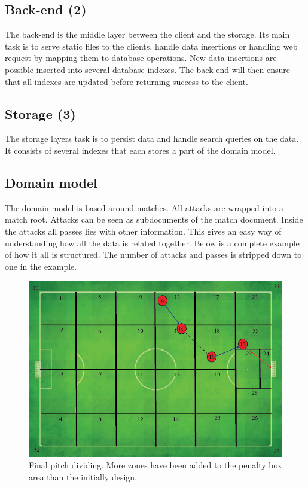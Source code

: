 \subsection{Back-end (2)}

The back-end is the middle layer between the client and the storage. Its main task is to serve static files to the clients, handle data insertions or handling web request by mapping them to database operations. New data insertions are possible inserted into several database indexes. The back-end will then ensure that all indexes are updated before returning success to the client. 

\subsection{Storage (3)}

The storage layers task is to persist data and handle search queries on the data. It consists of several indexes that each stores a part of the domain model. 

\subsection{Domain model}

The domain model is based around matches. All attacks are wrapped into a match root. Attacks can be seen as subdocuments of the match document. Inside the attacks all passes lies with other information. This gives an easy way of understanding how all the data is related together. Below is a complete example of how it all is structured. The number of attacks and passes is stripped down to one in the example.


\label{list:domainmodel}

\begin{figure}[ht!]
\centering
\includegraphics[width=1\textwidth]{images/general/capture_illustration.png}
\caption{Final pitch dividing. More zones have been added to the penalty box area than the initially design. }
\label{fig:finalPitchDividing}
\end{figure}

